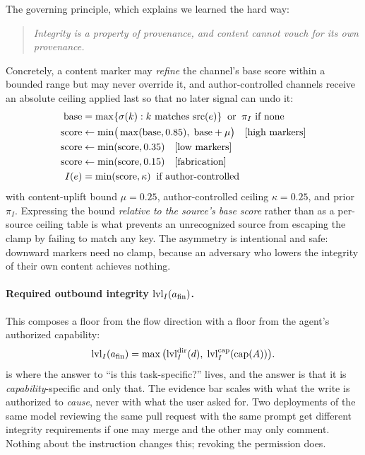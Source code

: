 The governing principle, which  explains we learned
the hard way:
\begin{quote}
\emph{Integrity is a property of provenance, and content cannot vouch for its
own provenance.}
\end{quote}
Concretely, a content marker may \emph{refine} the channel's base score within
a bounded range but may never override it, and author-controlled channels
receive an absolute ceiling applied last so that no later signal can undo it:
\begin{align}
\text{base}   &= \textstyle\max\{\sigma(k) : k \text{ matches } \mathrm{src}(e)\}
                 \;\;\text{or}\;\; \pi_I \text{ if none}\\
\text{score}  &\leftarrow \min\!\big(\max(\text{base}, 0.85),\;
                 \text{base} + \mu\big) \quad \text{[high markers]}\\
\text{score}  &\leftarrow \min(\text{score}, 0.35) \quad \text{[low markers]}\\
\text{score}  &\leftarrow \min(\text{score}, 0.15) \quad \text{[fabrication]}\\
I(e)        &= \min(\text{score}, \kappa) \;\;\text{if author-controlled}
\end{align}
with content-uplift bound $\mu = 0.25$, author-controlled ceiling
$\kappa = 0.25$, and prior $\pi_I$. Expressing the bound \emph{relative to the
source's base score} rather than as a per-source ceiling table is what prevents
an unrecognized source from escaping the clamp by failing to match any key.
The asymmetry is intentional and safe: downward markers need no clamp, because
an adversary who lowers the integrity of their own content achieves nothing.

\paragraph{Required outbound integrity $\mathrm{lvl}_I(a_{\mathrm{fin}})$.} This composes a floor
from the flow direction with a floor from the agent's authorized capability:
\begin{equation}
\mathrm{lvl}_I(a_{\mathrm{fin}}) = \max\big(\mathrm{lvl}_I^{\mathrm{dir}}(d),\;
                        \mathrm{lvl}_I^{\mathrm{cap}}(\mathrm{cap}(A))\big).
\label{eq:lvlI}
\end{equation}
 is where the answer to ``is this task-specific?'' lives, and the
answer is that it is \emph{capability}-specific and only that. The evidence bar
scales with what the write is authorized to \emph{cause}, never with what the
user asked for. Two deployments of the same model reviewing the same pull
request with the same prompt get different integrity requirements if one may
merge and the other may only comment. Nothing about the instruction changes
this; revoking the permission does.

